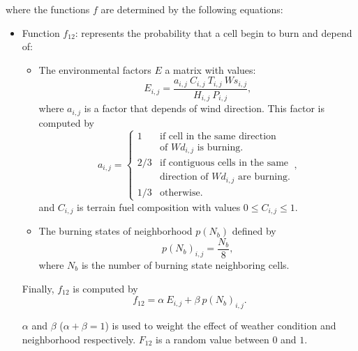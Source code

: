 \documentclass[conference]{IEEEtran}
\begin{document}
        where the functions $f$ are determined by the following equations:
        
        \begin{itemize}
          \item Function $f_{12}$: represents the probability that a cell begin to burn and depend of:
            \begin{itemize}
              \item The environmental factors $E$ a matrix with values:
                \begin{equation}
                  E_{i,j} = \frac{a_{i,j} ~ C_{i,j} ~ T_{i,j} ~ Ws_{i,j}}{H_{i,j} ~ P_{i,j}},
                \end{equation}
                where $a_{i,j}$ is a factor that depends of wind direction. This factor is computed by
                \begin{equation}
                  a_{i,j} = 
                  \begin{cases}
                    1 & \text{if cell in the same direction} \\
                     & \text{of $Wd_{i,j}$ is burning.}\\
                    2/3 & \text{if contiguous cells in the same} \\
                     & \text{direction of $Wd_{i,j}$ are burning.} \\
                    1/3 & \text{otherwise.}
                  \end{cases},
                \end{equation}
                and $C_{i,j}$ is terrain fuel composition with values $0\leq C_{i,j}\leq 1$.
              \item The burning states of neighborhood $p(N_b)$ defined by
                \begin{equation}
                    p(N_b)_{i,j} = \frac{N_b}{8},
                \end{equation}
                where $N_b$ is the number of burning state neighboring cells.
            \end{itemize}
            Finally, $f_{12}$ is computed by
            \begin{equation}
                f_{12} = \alpha ~ E_{i,j} + \beta ~ p(N_b)_{i,j}.
            \end{equation}
                
            $\alpha$ and $\beta$ ($\alpha+\beta = 1$) is used to weight the effect of weather condition 
            and neighborhood respectively. $F_{12}$ is a random value between $0$ and $1$.
              

\end{itemize}
\end{document}
